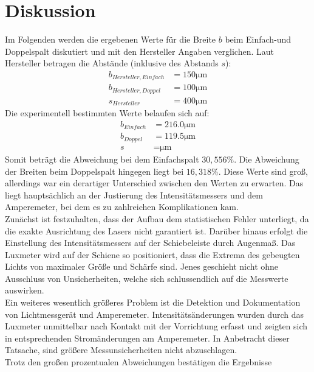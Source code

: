 \section{Diskussion}
\label{sec:Diskussion}

Im Folgenden werden die ergebenen Werte für die Breite $b$ beim Einfach-und 
Doppelspalt diskutiert und mit den Hersteller Angaben verglichen. Laut Hersteller
betragen die Abstände (inklusive des Abstands $s$):
\begin{align*}
    b_{Hersteller,Einfach} &= 150 \unit{\micro\meter} \\
    b_{Hersteller,Doppel}  &= 100 \unit{\micro\meter} \\
    s_{Hersteller}         &= 400 \unit{\micro\meter}
\end{align*}
\noindent Die experimentell bestimmten Werte belaufen sich auf:
\begin{align*}
    b_{Einfach} &= 216.0 \unit{\micro\meter} \\
    b_{Doppel}  &= 119.5 \unit{\micro\meter} \\
    s           &=  \unit{\micro\meter}
\end{align*}
\noindent Somit beträgt die Abweichung bei dem Einfachspalt $30,556 \%$. Die 
Abweichung der Breiten beim Doppelspalt hingegen liegt bei $16,318 \%$. Diese 
Werte sind groß, allerdings war ein derartiger Unterschied zwischen den Werten 
zu erwarten. Das liegt hauptsächlich an der Justierung des Intensitätsmessers 
und dem Amperemeter, bei dem es zu zahlreichen Komplikationen kam. 
\\
\noindent Zunächst ist
festzuhalten, dass der Aufbau dem statistischen Fehler unterliegt, da die
exakte Ausrichtung des Lasers nicht garantiert ist. Darüber hinaus erfolgt 
die Einstellung des Intensitätsmessers auf der Schiebeleiste durch Augenmaß. 
Das Luxmeter wird auf der Schiene so positioniert, dass die Extrema des 
gebeugten Lichts von maximaler Größe und Schärfe sind. Jenes geschieht nicht 
ohne Ausschluss von Unsicherheiten, welche sich schlussendlich auf die 
Messwerte auswirken.
\\
\noindent Ein weiteres wesentlich größeres Problem ist die Detektion und 
Dokumentation von Lichtmessgerät und Amperemeter. Intensitätsänderungen
wurden durch das Luxmeter unmittelbar nach Kontakt mit der Vorrichtung
erfasst und zeigten sich in entsprechenden Stromänderungen am Amperemeter.
In Anbetracht dieser Tatsache, sind größere Messunsicherheiten nicht abzuschlagen.
\\
\noindent Trotz den großen prozentualen Abweichungen bestätigen die Ergebnisse
